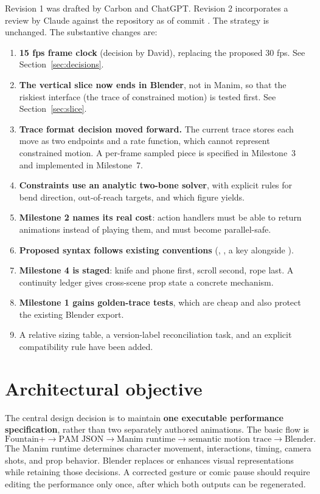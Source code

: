 \documentclass[12pt,letterpaper]{article}
\newcommand{\file}[1]{\texttt{\detokenize{#1}}}
\begin{document}
Revision 1 was drafted by Carbon and ChatGPT. Revision 2 incorporates a review by Claude against the repository as of commit \file{c91c82d}. The strategy is unchanged. The substantive changes are:
\begin{enumerate}
\item \textbf{15 fps frame clock} (decision by David), replacing the proposed 30 fps. See Section~\ref{sec:decisions}.
\item \textbf{The vertical slice now ends in Blender}, not in Manim, so that the riskiest interface (the trace of constrained motion) is tested first. See Section~\ref{sec:slice}.
\item \textbf{Trace format decision moved forward.} The current trace stores each move as two endpoints and a rate function, which cannot represent constrained motion. A per-frame sampled piece is specified in Milestone~3 and implemented in Milestone~7.
\item \textbf{Constraints use an analytic two-bone solver}, with explicit rules for bend direction, out-of-reach targets, and which figure yields.
\item \textbf{Milestone 2 names its real cost}: action handlers must be able to return animations instead of playing them, and \file{say} must become parallel-safe.
\item \textbf{Proposed syntax follows existing conventions} (\file{do}, \file{wait}, a \file{frames} key alongside \file{rt}).
\item \textbf{Milestone 4 is staged}: knife and phone first, scroll second, rope last. A continuity ledger gives cross-scene prop state a concrete mechanism.
\item \textbf{Milestone 1 gains golden-trace tests}, which are cheap and also protect the existing Blender export.
\item A relative sizing table, a version-label reconciliation task, and an explicit compatibility rule have been added.
\end{enumerate}

\section{Architectural objective}

The central design decision is to maintain \textbf{one executable performance specification}, rather than two separately authored animations. The basic flow is
\[
\text{Fountain+}\longrightarrow\text{PAM JSON}\longrightarrow
\text{Manim runtime}\longrightarrow\text{semantic motion trace}
\longrightarrow\text{Blender}.
\]
The Manim runtime determines character movement, interactions, timing, camera shots, and prop behavior. Blender replaces or enhances visual representations while retaining those decisions. A corrected gesture or comic pause should require editing the performance only once, after which both outputs can be regenerated.
\end{document}
